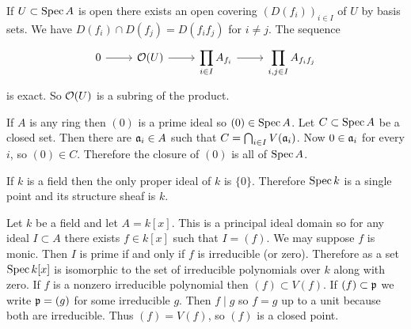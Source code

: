 If $U \subset \operatorname{Spec} A$ is open there exists an open covering $(D(f_i))_{i \in I}$ of $U$ by basis sets.
We have $D(f_i) \cap D(f_j) = D(f_i f_j)$ for $i \not= j$.
The sequence
\[
\begin{tikzcd}
0 \ar[r] &
\cc O(U) \ar[r] &
\displaystyle
\prod_{i \in I} A_{f_i} \ar[r] &
\displaystyle
\prod_{i,j \in I} A_{f_i f_j}
\end{tikzcd}
\]
is exact.
So $\mathcal{O}(U)$ is a subring of the product.



\begin{exam}
If $A$ is any ring then $(0)$ is a prime ideal so $(0) \in \operatorname{Spec} A$.
Let $C \subset \operatorname{Spec} A$ be a closed set.
Then there are $\mathfrak{a}_i \in A$ such that $C = \bigcap_{i \in I} V(\mathfrak{a}_i)$.
Now $0 \in \mathfrak{a}_i$ for every $i$, so $(0) \in C$.
Therefore the closure of $(0)$ is all of $\operatorname{Spec} A$.
\end{exam}


\begin{exam}
If $k$ is a field then the only proper ideal of $k$ is $\{0\}$.
Therefore $\operatorname{Spec} k$ is a single point and its structure sheaf is $k$.
\end{exam}

\begin{exam}
Let $k$ be a field and let $A = k[x]$.
This is a principal ideal domain so for any ideal $I \subset A$ there exists $f \in k[x]$ such that $I = (f)$.
We may suppose $f$ is monic.
Then $I$ is prime if and only if $f$ is irreducible (or zero).
Therefore as a set $\operatorname{Spec} k[x]$ is isomorphic to the set of irreducible polynomials over $k$ along with zero.
If $f$ is a nonzero irreducible polynomial then $(f) \subset V(f)$.
If $(f) \subset \mathfrak{p}$ we write $\mathfrak{p} = (g)$ for some irreducible $g$.
Then $f \mid g$ so $f = g$ up to a unit because both are irreducible.
Thus $(f) = V(f)$, so $(f)$ is a closed point.
\end{exam}
